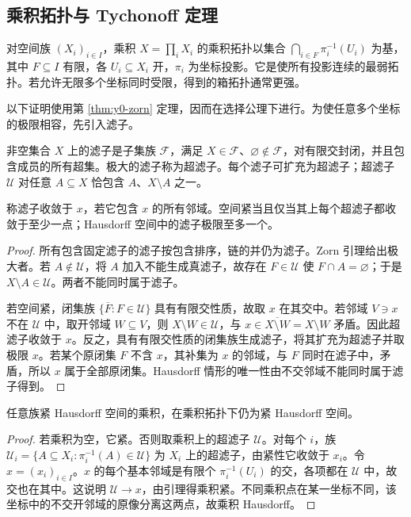 \subsection{乘积拓扑与 Tychonoff 定理}
\begin{definition}[乘积拓扑]\label{def:y0-product-topology}
对空间族 $(X_i)_{i\in I}$，乘积 $X=\prod_iX_i$ 的乘积拓扑以集合 $\bigcap_{i\in F}\pi_i^{-1}(U_i)$ 为基，其中 $F\subseteq I$ 有限，各 $U_i\subseteq X_i$ 开，$\pi_i$ 为坐标投影。它是使所有投影连续的最弱拓扑。若允许无限多个坐标同时受限，得到的箱拓扑通常更强。
\end{definition}

以下证明使用第 \ref{thm:y0-zorn} 定理，因而在选择公理下进行。为使任意多个坐标的极限相容，先引入滤子。

\begin{lemma}[超滤子与紧性]\label{lem:y0-ultrafilter}
非空集合 $X$ 上的滤子是子集族 $\mathcal F$，满足 $X\in\mathcal F$、$\varnothing\notin\mathcal F$，对有限交封闭，并且包含成员的所有超集。极大的滤子称为超滤子。每个滤子可扩充为超滤子；超滤子 $\mathcal U$ 对任意 $A\subseteq X$ 恰包含 $A$、$X\setminus A$ 之一。

称滤子收敛于 $x$，若它包含 $x$ 的所有邻域。空间紧当且仅当其上每个超滤子都收敛于至少一点；Hausdorff 空间中的滤子极限至多一个。
\end{lemma}
\begin{proof}
所有包含固定滤子的滤子按包含排序，链的并仍为滤子。Zorn 引理给出极大者。若 $A\notin\mathcal U$，将 $A$ 加入不能生成真滤子，故存在 $F\in\mathcal U$ 使 $F\cap A=\varnothing$；于是 $X\setminus A\in\mathcal U$。两者不能同时属于滤子。

若空间紧，闭集族 $\{\overline F:F\in\mathcal U\}$ 具有有限交性质，故取 $x$ 在其交中。若邻域 $V\ni x$ 不在 $\mathcal U$ 中，取开邻域 $W\subseteq V$，则 $X\setminus W\in\mathcal U$，与 $x\in\overline{X\setminus W}=X\setminus W$ 矛盾。因此超滤子收敛于 $x$。反之，具有有限交性质的闭集族生成滤子，将其扩充为超滤子并取极限 $x$。若某个原闭集 $F$ 不含 $x$，其补集为 $x$ 的邻域，与 $F$ 同时在滤子中，矛盾，所以 $x$ 属于全部原闭集。Hausdorff 情形的唯一性由不交邻域不能同时属于滤子得到。
\end{proof}

\begin{theorem}[Tychonoff 定理]\label{thm:y0-tychonoff}
任意族紧 Hausdorff 空间的乘积，在乘积拓扑下仍为紧 Hausdorff 空间。
\end{theorem}
\begin{proof}
若乘积为空，它紧。否则取乘积上的超滤子 $\mathcal U$。对每个 $i$，族 $\mathcal U_i=\{A\subseteq X_i:\pi_i^{-1}(A)\in\mathcal U\}$ 为 $X_i$ 上的超滤子，由紧性它收敛于 $x_i$。令 $x=(x_i)_{i\in I}$。$x$ 的每个基本邻域是有限个 $\pi_i^{-1}(U_i)$ 的交，各项都在 $\mathcal U$ 中，故交也在其中。这说明 $\mathcal U\to x$，由引理得乘积紧。不同乘积点在某一坐标不同，该坐标中的不交开邻域的原像分离这两点，故乘积 Hausdorff。
\end{proof}

